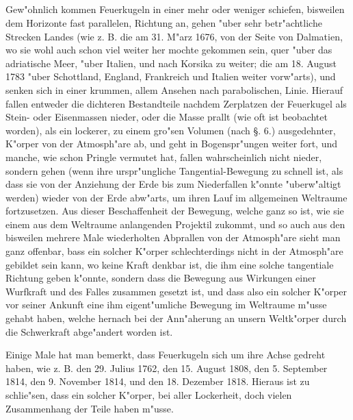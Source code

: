 \documentclass[a4paper, 11pt, oneside, polutonikogreek, german]{article}
\begin{document}
\subsection{}
\paragraph{}
Gew"ohnlich kommen Feuerkugeln in einer mehr oder weniger schiefen, bisweilen dem Horizonte fast parallelen, Richtung an, gehen "uber sehr betr"achtliche Strecken Landes (wie z. B. die am 31. M"arz 1676, von der Seite von Dalmatien, wo sie wohl auch schon viel weiter her mochte gekommen sein, quer "uber das adriatische Meer, "uber Italien, und nach Korsika zu weiter; die am 18. August 1783 "uber Schottland, England, Frankreich und Italien weiter vorw"arts), und senken sich in einer krummen, allem Ansehen nach parabolischen, Linie. Hierauf fallen entweder die dichteren Bestandteile nachdem Zerplatzen der Feuerkugel als Stein- oder Eisenmassen nieder, oder die Masse prallt (wie oft ist beobachtet worden), als ein lockerer, zu einem gro"sen Volumen (nach §. 6.) ausgedehnter, K"orper von der Atmosph"are ab, und geht in Bogenspr"ungen weiter fort, und manche, wie schon Pringle vermutet hat, fallen wahrscheinlich nicht nieder, sondern gehen (wenn ihre urspr"ungliche Tangential-Bewegung zu schnell ist, als dass sie von der Anziehung der Erde bis zum Niederfallen k"onnte "uberw"altigt werden) wieder von der Erde abw"arts, um ihren Lauf im allgemeinen Weltraume fortzusetzen. Aus dieser Beschaffenheit der Bewegung, welche ganz so ist, wie sie einem aus dem Weltraume anlangenden Projektil zukommt, und so auch aus den bisweilen mehrere Male wiederholten Abprallen von der Atmosph"are sieht man ganz offenbar, bass ein solcher K"orper schlechterdings nicht in der Atmosph"are gebildet sein kann, wo keine Kraft denkbar ist, die ihm eine solche tangentiale Richtung geben k"onnte, sondern dass die Bewegung aus Wirkungen einer Wurfkraft und des Falles zusammen gesetzt ist, und dass also ein solcher K"orper vor seiner Ankunft eine ihm eigent"umliche Bewegung im Weltraume m"usse gehabt haben, welche hernach bei der Ann"aherung an unsern Weltk"orper durch die Schwerkraft abge"andert worden ist.

Einige Male hat man bemerkt, dass Feuerkugeln sich um ihre Achse gedreht haben, wie z. B. den 29. Julius 1762, den 15. August 1808, den 5. September 1814, den 9. November 1814, und den 18. Dezember 1818. Hieraus ist zu schlie"sen, dass ein solcher K"orper, bei aller Lockerheit, doch vielen Zusammenhang der Teile haben m"usse.
\end{document}
